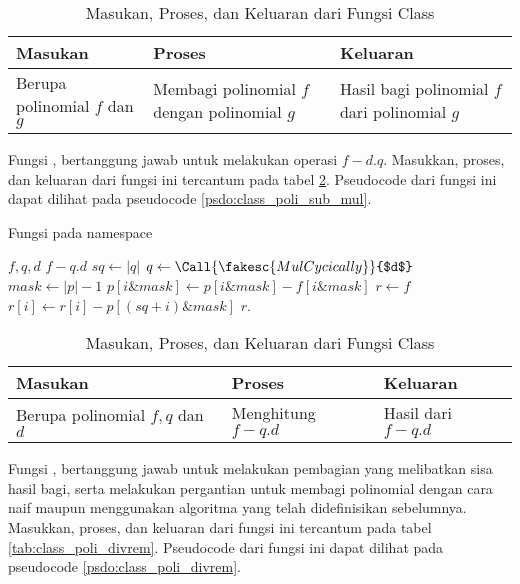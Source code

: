 \begin{table}[]	
	\Centering
	\begin{tabular}{|p{3cm}|p{3cm}|p{3cm}|}
	\hline
	Masukan & Proses & Keluaran \\ \hline
	Berupa polinomial $f$ dan $g$ & Membagi polinomial $f$ dengan polinomial $g$  & Hasil bagi polinomial $f$ dari polinomial $g$\\ \hline
	\end{tabular}
	\caption{Masukan, Proses, dan Keluaran dari Fungsi  Class }
	\label{tab:class_poli_quotient}
\end{table}

\newpage

Fungsi , bertanggung jawab untuk melakukan operasi $ f - d.q $. Masukkan, proses, dan keluaran dari fungsi ini tercantum pada tabel \ref{tab:class_poli_sub_mul}. Pseudocode dari fungsi ini dapat dilihat pada pseudocode \ref{psdo:class_poli_sub_mul}.

\begin{algorithm}
	\caption{Fungsi  pada namespace }
	\label{psdo:class_poli_sub_mul}
	\begin{algorithmic}[1]
		\Require $ f, q, d $
		\Ensure $ f - q.d $
		\State $ sq \leftarrow |q| $
		\State $ q \leftarrow \Call{\fakesc{MulCycically}}{$d$}$
		\State $ mask \leftarrow |p| - 1$
			\State $ p[i \& mask] \leftarrow p[i \& mask] - f[i \& mask]$
		\EndFor
		\State $ r \leftarrow f $
			\State $ r[i] \leftarrow r[i] - p[(sq + i) \& mask]$
		\EndFor
		\State \Return $ r $.
	\end{algorithmic}
\end{algorithm}

\begin{table}[]	
	\Centering
	\begin{tabular}{|p{3cm}|p{3cm}|p{3cm}|}
	\hline
	Masukan & Proses & Keluaran \\ \hline
	Berupa polinomial $f , q$ dan $d$ & Menghitung $ f - q.d $  & Hasil dari $ f - q.d $\\ \hline
	\end{tabular}
	\caption{Masukan, Proses, dan Keluaran dari Fungsi  Class }
	\label{tab:class_poli_sub_mul}
\end{table}

\newpage

Fungsi , bertanggung jawab untuk melakukan pembagian yang melibatkan sisa hasil bagi, serta melakukan pergantian untuk membagi polinomial dengan cara naif maupun menggunakan algoritma yang telah didefinisikan sebelumnya. Masukkan, proses, dan keluaran dari fungsi ini tercantum pada tabel \ref{tab:class_poli_divrem}. Pseudocode dari fungsi ini dapat dilihat pada pseudocode \ref{psdo:class_poli_divrem}.

